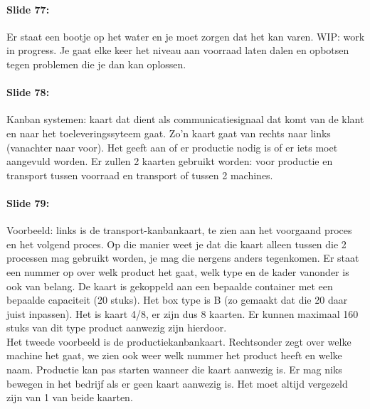 \documentclass[10pt,a4paper]{report}
\begin{document}
\paragraph{Slide 77:} Er staat een bootje op het water en je moet zorgen dat het kan varen. WIP: work in progress. Je gaat elke keer het niveau aan voorraad laten dalen en opbotsen tegen problemen die je dan kan oplossen. 

\paragraph{Slide 78:} Kanban systemen: kaart dat dient als communicatiesignaal dat komt van de klant en naar het toeleveringssyteem gaat. Zo'n kaart gaat van rechts naar links (vanachter naar voor). Het geeft aan of er productie nodig is of er iets moet aangevuld worden. Er zullen 2 kaarten gebruikt worden: voor productie en transport tussen voorraad en transport of tussen 2 machines. 

\paragraph{Slide 79:} Voorbeeld: links is de transport-kanbankaart, te zien aan het voorgaand proces en het volgend proces. Op die manier weet je dat die kaart alleen tussen die 2 processen mag gebruikt worden, je mag die nergens anders tegenkomen. Er staat een nummer op over welk product het gaat, welk type en de kader vanonder is ook van belang. De kaart is gekoppeld aan een bepaalde container met een bepaalde capaciteit (20 stuks). Het box type is B (zo gemaakt dat die 20 daar juist inpassen). Het is kaart 4/8, er zijn dus 8 kaarten. Er kunnen maximaal 160 stuks van dit type product aanwezig zijn hierdoor. \\
Het tweede voorbeeld is de productiekanbankaart. Rechtsonder zegt over welke machine het gaat, we zien ook weer welk nummer het product heeft en welke naam. Productie kan pas starten wanneer die kaart aanwezig is. Er mag niks bewegen in het bedrijf als er geen kaart aanwezig is. Het moet altijd vergezeld zijn van 1 van beide kaarten.
\end{document}
